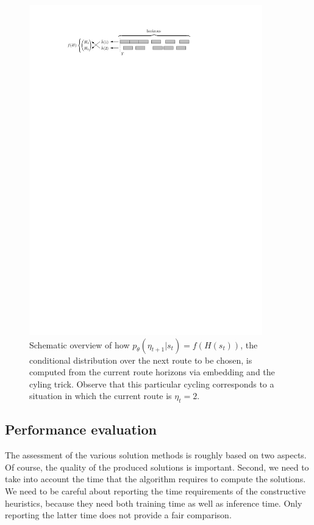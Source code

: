 \documentclass[a4paper]{article}
\theoremstyle{definition}
\theoremstyle{plain}
\begin{document}
\begin{figure}
  \centering
  \includegraphics[width=0.9\textwidth]{figures/single/embedding}
  \caption{Schematic overview of how
    $p_{\theta}(\eta_{t+1} | s_{t}) = f(H(s_{t}))$, the conditional distribution
    over the next route to be chosen, is computed from the current route
    horizons via embedding and the cyling trick. Observe that this particular
    cycling corresponds to a situation in which the current route is
    $\eta_{t} = 2$.}\label{fig:neural_embedding}
\end{figure}


\subsection{Performance evaluation}

The assessment of the various solution methods is roughly based on two
aspects. Of course, the quality of the produced solutions is important. Second,
we need to take into account the time that the algorithm requires to compute the
solutions. We need to be careful about reporting the time requirements of the
constructive heuristics, because they need both training time as well as
inference time. Only reporting the latter time does not provide a fair
comparison.
\end{document}

